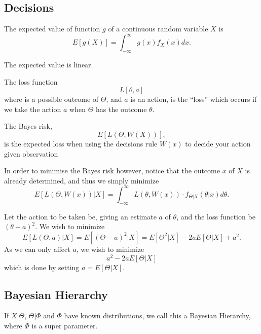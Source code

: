 \subsection{Decisions}
\begin{definition}
	The expected value of function \(g\) of a continuous random variable \(X\) is 
	\[
		E\left[g(X)\right] = \int_{-\infty }^{\infty} g(x) f _{X}(x) dx.
	\]
\end{definition}

\begin{obs}
	The expected value is linear.
\end{obs}


\begin{definition}
	The loss function
	\[
		L\left[\theta , a\right]
	\]
	where is a possible outcome of \(\Theta \), and \(a\) is an action, is the ``loss'' which occurs if we take the action \(a\) when \(\Theta \) has the outcome \(\theta \).
\end{definition}

\begin{definition}
	The Bayes risk,
	\[
		E\left[L(\Theta, W(X))\right],
	\]
	is the expected loss when using the decisions rule \(W(x)\) to decide your action given observation
\end{definition}

\begin{theorem}
	In order to minimise the Bayes risk however, notice that the outcome \(x\) of \(X\) is already determined, and thus we simply minimize
	\[
		E\left[L(\Theta, W(x))| X\right] = \int_{- \infty }^{\infty} L(\theta , W(x))  \cdot f _{\Theta | X}(\theta |x) d \theta.
	\]
\end{theorem}

\begin{example}
	Let the action to be taken be, giving an estimate \(a\) of \(\theta\), and the loss function be \((\theta -a)^2\). We wish to minimize
	\[
		E[L(\Theta, a)|X] = E [ (\Theta - a)^2 |X] = E[\Theta ^2|X] -2aE[\Theta |X] + a^2.
	\]
	As we can only affect \(a\), we wish to minimize
	\[
		a^2-2aE[\Theta |X]
	\]
	which is done by setting \(a = E[\Theta |X]\).
\end{example}

\subsection{Bayesian Hierarchy}

\begin{definition}
	If \(X|\Theta \), \(\Theta | \Phi \) and \(\Phi \) have known distributions, we call this a Bayesian Hierarchy, where \(\Phi \) is a super parameter.
\end{definition}


